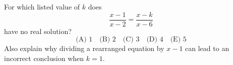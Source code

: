 For which listed value of $k$ does
\[
\dfrac{x-1}{x-2}=\dfrac{x-k}{x-6}
\]
have no real solution?
\[
\text{(A) }1\quad\text{(B) }2\quad\text{(C) }3\quad\text{(D) }4\quad\text{(E) }5
\]
Also explain why dividing a rearranged equation by $x-1$ can lead to an incorrect conclusion when $k=1$.
